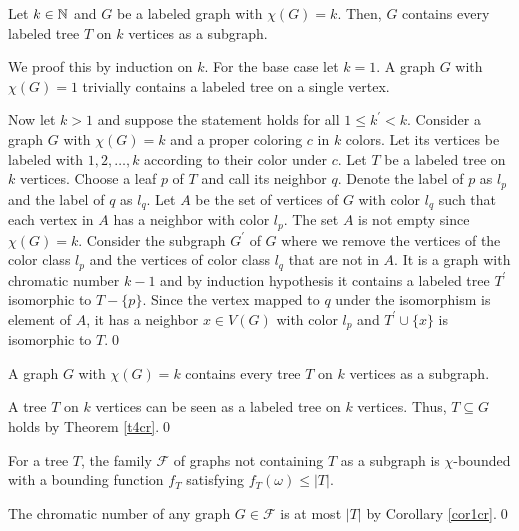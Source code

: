 \begin{thm}\label{t4cr}
Let $k\in\mathbb{N}$ and $G$ be a labeled graph with $\chi (G) = k$. Then, $G$ contains every labeled tree $T$ on $k$ vertices as a subgraph. 
\end{thm}
\begin{prf}
We proof this by induction on $k$. For the base case let $k=1$. A graph $G$ with $\chi (G)=1$ trivially contains a labeled tree on a single vertex.

Now let $k>1$ and suppose the statement holds for all $1\leq k^\prime <k$. Consider a graph $G$ with $\chi (G) = k$ and a proper coloring $c$ in $k$ colors. Let its vertices be labeled with $1, 2, \dots , k$ according to their color under $c$. Let $T$ be a labeled tree on $k$ vertices. Choose a leaf $p$ of $T$ and call its neighbor $q$. Denote the label of $p$ as $l_p$ and the label of $q$ as $l_q$. Let $A$ be the set of vertices of $G$ with color $l_q$ such that each vertex in $A$ has a neighbor with color $l_p$. The set $A$ is not empty since $\chi (G)=k$. Consider the subgraph $G^\prime$ of $G$ where we remove the vertices of the color class $l_p$ and the vertices of color class $l_q$ that are not in $A$. It is a graph with chromatic number $k-1$ and by induction hypothesis it contains a labeled tree $T^\prime$ isomorphic to $T-\lbrace p\rbrace$. Since the vertex mapped to $q$ under the isomorphism is element of $A$, it has a neighbor $x\in V(G)$ with color $l_p$ and $T^\prime\cup\lbrace x\rbrace$ is isomorphic to $T$.\qed
\end{prf}
\begin{cor}\label{cor1cr}
A graph $G$ with $\chi (G) = k$ contains every tree $T$ on $k$ vertices as a subgraph. 
\end{cor}
\begin{prf}
A tree $T$ on $k$ vertices can be seen as a labeled tree on $k$ vertices. Thus, $T\subseteq G$ holds by Theorem \ref{t4cr}.\qed
\end{prf}

\begin{cor}
For a tree $T$, the family $\mathcal{F}$ of graphs not containing $T$ as a subgraph is $\chi$-bounded with a bounding function $f_T$ satisfying $f_T(\omega )\leq\vert T\vert$.
\end{cor}
\begin{prf}
The chromatic number of any graph $G\in\mathcal{F}$ is at most $\vert T\vert$ by Corollary \ref{cor1cr}.\qed
\end{prf}

